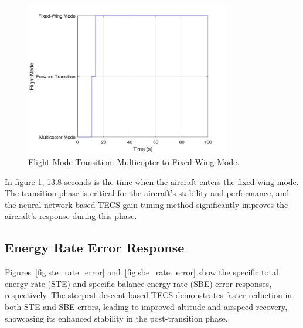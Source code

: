 \documentclass[journal,article,submit,pdftex,moreauthors]{Definitions/mdpi}
\begin{document}
\begin{figure}[H]
    \centering
    \includegraphics[width=0.8\textwidth]{flight_state_plot.png}
    \caption{Flight Mode Transition: Multicopter to Fixed-Wing Mode.}
    \label{fig:flight_state}
\end{figure}

In figure \ref{fig:flight_state}, 13.8 seconds is the time when the aircraft enters the fixed-wing mode. The transition phase is critical for the aircraft's stability and performance, and the neural network-based TECS gain tuning method significantly improves the aircraft's response during this phase.

\subsection{Energy Rate Error Response}
Figures~\ref{fig:ste_rate_error} and~\ref{fig:sbe_rate_error} show the specific total energy rate (STE) and specific balance energy rate (SBE) error responses, respectively. The steepest descent-based TECS demonstrates faster reduction in both STE and SBE errors, leading to improved altitude and airspeed recovery, showcasing its enhanced stability in the post-transition phase.
\end{document}
